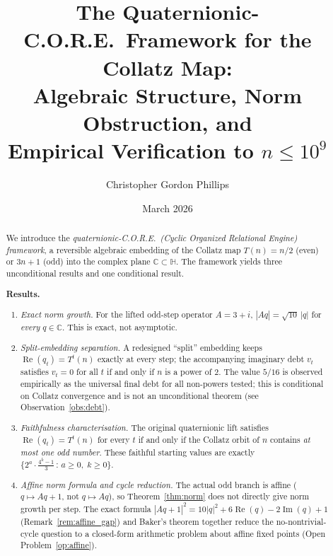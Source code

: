 \documentclass[12pt,reqno]{amsart}
\theoremstyle{plain}
\theoremstyle{definition}
\theoremstyle{remark}
\newcommand{\HH}{\mathbb{H}}
\newcommand{\CC}{\mathbb{C}}
\newcommand{\abs}[1]{\left|#1\right|}
\begin{document}
\title[Quaternionic-C.O.R.E. Framework for the Collatz Map]{%
  The Quaternionic-C.O.R.E.\ Framework for the Collatz Map:\\
  Algebraic Structure, Norm Obstruction, and\\
  Empirical Verification to $n \leq 10^9$}

\author{Christopher Gordon Phillips}
\address{LumenHelix Solutions}
\date{March 2026}



\begin{abstract}
We introduce the \emph{quaternionic-C.O.R.E.\ (Cyclic Organized Relational
Engine) framework}, a reversible algebraic embedding of the Collatz map
$T(n) = n/2$ (even) or $3n+1$ (odd) into the complex plane $\CC \subset \HH$.
The framework yields three unconditional results and one conditional result.

\medskip
\noindent\textbf{Results.}
\begin{enumerate}
\item \emph{Exact norm growth.}  For the lifted odd-step operator $A = 3+i$,
  $\abs{Aq} = \sqrt{10}\,\abs{q}$ for \emph{every} $q \in \CC$.
  This is exact, not asymptotic.

\item \emph{Split-embedding separation.}  A redesigned ``split'' embedding
  keeps $\operatorname{Re}(q_t) = T^t(n)$ exactly at every step; the
  accompanying imaginary debt $v_t$ satisfies $v_t = 0$ for all $t$ if and
  only if $n$ is a power of $2$.  The value $5/16$ is observed empirically
  as the universal final debt for all non-powers tested; this is conditional
  on Collatz convergence and is not an unconditional theorem
  (see Observation~\ref{obs:debt}).

\item \emph{Faithfulness characterisation.}  The original quaternionic lift
  satisfies $\operatorname{Re}(q_t) = T^t(n)$ for every $t$ if and only if
  the Collatz orbit of $n$ contains \emph{at most one odd number}.  These
  faithful starting values are exactly $\bigl\{2^a \cdot \tfrac{4^k-1}{3}
  \,:\, a \geq 0,\; k \geq 0 \bigr\}$.

\item \emph{Affine norm formula and cycle reduction.}
  The actual odd branch is affine ($q \mapsto Aq+1$, not $q \mapsto Aq$),
  so Theorem~\ref{thm:norm} does not directly give norm growth per step.
  The exact formula $\abs{Aq+1}^2 = 10\abs{q}^2 + 6\operatorname{Re}(q)
  - 2\operatorname{Im}(q) + 1$ (Remark~\ref{rem:affine_gap}) and
  Baker's theorem together reduce the no-nontrivial-cycle question to a
  closed-form arithmetic problem about affine fixed points
  (Open Problem~\ref{op:affine}).
\end{enumerate}


\end{abstract}
\end{document}
